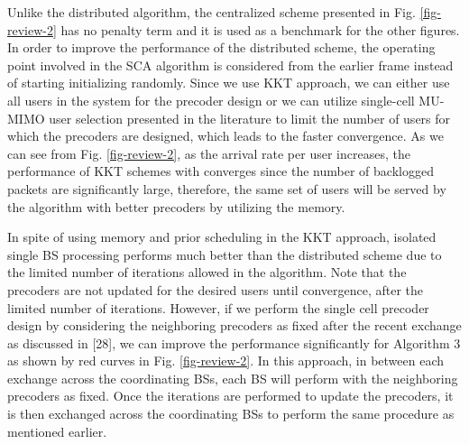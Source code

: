 \begin{enumerate}
	Unlike the distributed algorithm, the centralized scheme presented in Fig. \ref{fig-review-2} has no penalty term and it is used as a benchmark for the other figures. In order to improve the performance of the distributed scheme, the operating point involved in the \ac{SCA} algorithm is considered from the earlier frame instead of starting initializing randomly. Since we use \ac{KKT} approach, we can either use all users in the system for the precoder design or we can utilize single-cell MU-MIMO user selection presented in the literature to limit the number of users for which the precoders are designed, which leads to the faster convergence. As we can see from Fig. \ref{fig-review-2}, as the arrival rate per user increases, the performance of \ac{KKT} schemes with  converges since the number of backlogged packets are significantly large, therefore, the same set of users will be served by the algorithm with better precoders by utilizing the memory. 
	
	In spite of using memory and prior scheduling in the \ac{KKT} approach, isolated single \ac{BS} processing performs much better than the distributed scheme due to the limited number of iterations allowed in the algorithm. Note that the precoders are not updated for the desired users until convergence, after the limited number of iterations. However, if we perform the single cell precoder design by considering the neighboring precoders as fixed after the recent exchange as discussed in [28], we can improve the performance significantly for Algorithm 3 as shown by red curves in Fig. \ref{fig-review-2}. In this approach, in between each exchange across the coordinating \acp{BS}, each \ac{BS} will perform  with the neighboring precoders as fixed. Once the iterations are performed to update the precoders, it is then exchanged across the coordinating \acp{BS} to perform the same procedure as mentioned earlier. 

 


\end{enumerate}
